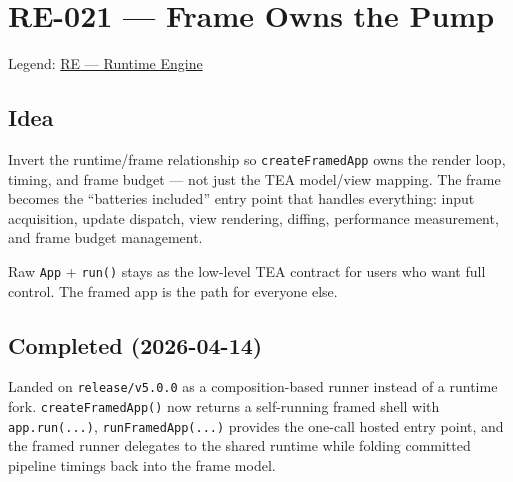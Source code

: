 \chapter{RE-021 --- Frame Owns the Pump}\label{record-373}

\smallskip

Legend: \href{https://github.com/flyingrobots/bijou/blob/1853ad902f6bf219326409e7f743a5a1d6517dbc/docs/legends/RE-runtime-engine.md}{RE --- Runtime Engine}

\section{Idea}\label{record-373-idea}

Invert the runtime/frame relationship so \texttt{c\allowbreak{}r\allowbreak{}e\allowbreak{}a\allowbreak{}t\allowbreak{}e\allowbreak{}F\allowbreak{}r\allowbreak{}a\allowbreak{}m\allowbreak{}e\allowbreak{}d\allowbreak{}A\allowbreak{}p\allowbreak{}p} owns the render loop, timing, and frame budget --- not just the TEA model/view mapping. The frame becomes the ``batteries included'' entry point that handles everything: input acquisition, update dispatch, view rendering, diffing, performance measurement, and frame budget management.

Raw \texttt{A\allowbreak{}p\allowbreak{}p} + \texttt{r\allowbreak{}u\allowbreak{}n\allowbreak{}(\allowbreak{})} stays as the low-level TEA contract for users who want full control. The framed app is the path for everyone else.

\section{Completed (2026-04-14)}\label{record-373-completed-2026-04-14}

Landed on \texttt{r\allowbreak{}e\allowbreak{}l\allowbreak{}e\allowbreak{}a\allowbreak{}s\allowbreak{}e\allowbreak{}/\allowbreak{}v\allowbreak{}5\allowbreak{}.\allowbreak{}0\allowbreak{}.\allowbreak{}0} as a composition-based runner instead of a runtime fork. \texttt{c\allowbreak{}r\allowbreak{}e\allowbreak{}a\allowbreak{}t\allowbreak{}e\allowbreak{}F\allowbreak{}r\allowbreak{}a\allowbreak{}m\allowbreak{}e\allowbreak{}d\allowbreak{}A\allowbreak{}p\allowbreak{}p\allowbreak{}(\allowbreak{})} now returns a self-running framed shell with \texttt{a\allowbreak{}p\allowbreak{}p\allowbreak{}.\allowbreak{}r\allowbreak{}u\allowbreak{}n\allowbreak{}(\allowbreak{}.\allowbreak{}.\allowbreak{}.\allowbreak{})}, \texttt{r\allowbreak{}u\allowbreak{}n\allowbreak{}F\allowbreak{}r\allowbreak{}a\allowbreak{}m\allowbreak{}e\allowbreak{}d\allowbreak{}A\allowbreak{}p\allowbreak{}p\allowbreak{}(\allowbreak{}.\allowbreak{}.\allowbreak{}.\allowbreak{})} provides the one-call hosted entry point, and the framed runner delegates to the shared runtime while folding committed pipeline timings back into the frame model.

